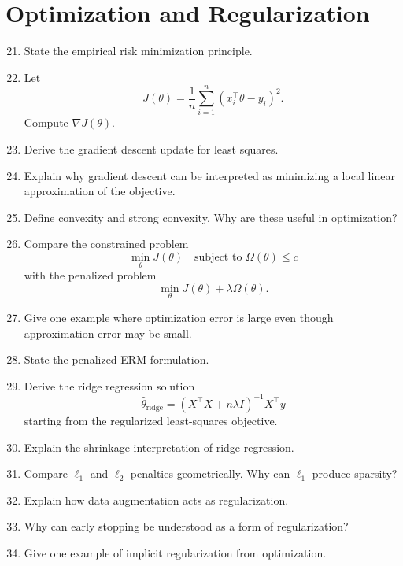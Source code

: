 \section*{Optimization and Regularization}

\begin{enumerate}
\setcounter{enumi}{20}
    \item State the empirical risk minimization principle.

    \item Let
    \[
    J(\theta)=\frac1n\sum_{i=1}^n (x_i^\top\theta-y_i)^2.
    \]
    Compute $\nabla J(\theta)$.

    \item Derive the gradient descent update for least squares.

    \item Explain why gradient descent can be interpreted as minimizing a local linear approximation of the objective.

    \item Define convexity and strong convexity. Why are these useful in optimization?

    \item Compare the constrained problem
    \[
    \min_\theta J(\theta)\quad \text{subject to } \Omega(\theta)\le c
    \]
    with the penalized problem
    \[
    \min_\theta J(\theta)+\lambda\Omega(\theta).
    \]

    \item Give one example where optimization error is large even though approximation error may be small.

    \item State the penalized ERM formulation.

    \item Derive the ridge regression solution
    \[
    \hat\theta_{\mathrm{ridge}}=(X^\top X+n\lambda I)^{-1}X^\top y
    \]
    starting from the regularized least-squares objective.

    \item Explain the shrinkage interpretation of ridge regression.

    \item Compare $\ell_1$ and $\ell_2$ penalties geometrically. Why can $\ell_1$ produce sparsity?

    \item Explain how data augmentation acts as regularization.

    \item Why can early stopping be understood as a form of regularization?

    \item Give one example of implicit regularization from optimization.
\end{enumerate}

